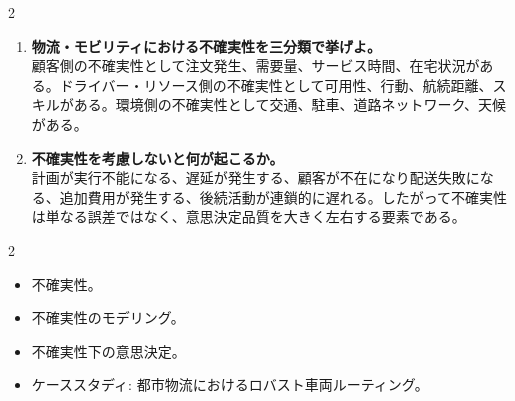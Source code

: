 \begin{multicols}{2}
\begin{enumerate}
\item \textbf{物流・モビリティにおける不確実性を三分類で挙げよ。}\\
顧客側の不確実性として注文発生、需要量、サービス時間、在宅状況がある。ドライバー・リソース側の不確実性として可用性、行動、航続距離、スキルがある。環境側の不確実性として交通、駐車、道路ネットワーク、天候がある。
\item \textbf{不確実性を考慮しないと何が起こるか。}\\
計画が実行不能になる、遅延が発生する、顧客が不在になり配送失敗になる、追加費用が発生する、後続活動が連鎖的に遅れる。したがって不確実性は単なる誤差ではなく、意思決定品質を大きく左右する要素である。
\end{enumerate}

\end{multicols}

\clearpage



\vspace{1.5mm}

\begin{multicols}{2}

\footnotesize

\raggedcolumns


\begin{itemize}
\item 不確実性。
\item 不確実性のモデリング。
\item 不確実性下の意思決定。
\item ケーススタディ: 都市物流におけるロバスト車両ルーティング。
\end{itemize}

\end{multicols}

\clearpage



\vspace{1.5mm}

